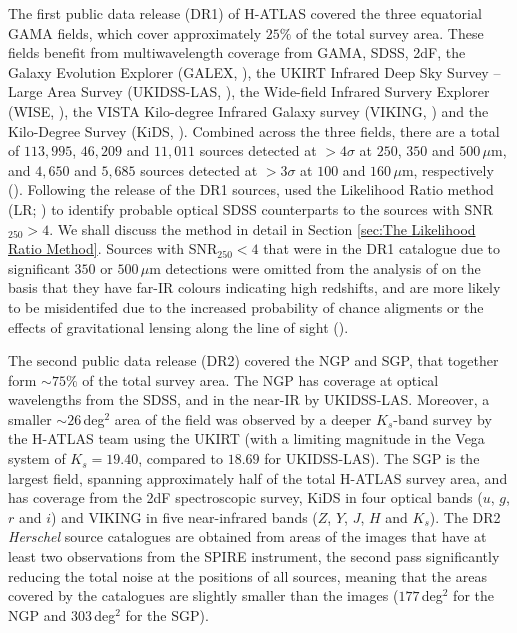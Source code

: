 The first public data release (DR1) of H-ATLAS covered the three equatorial GAMA fields, which cover approximately $25\%$ of the total survey area. These fields benefit from multiwavelength coverage from GAMA, SDSS, 2dF, the Galaxy Evolution Explorer (GALEX, \citealt{Martin_2005}), the UKIRT Infrared Deep Sky Survey -- Large Area Survey (UKIDSS-LAS, \citealt{Lawrence_2007}), the Wide-field Infrared Survery Explorer (WISE, \citealt{Wright_2010}), the VISTA Kilo-degree Infrared Galaxy survey (VIKING, \citealt{Edge_2013}) and the Kilo-Degree Survey (KiDS, \citealt{deJong_2013}). Combined across the three fields, there are a total of $113,995$, $46,209$ and $11,011$ sources detected at $> 4\sigma$ at $250$, $350$ and $500\,\mu$m, and $4,650$ and $5,685$ sources detected at $> 3\sigma$ at $100$ and $160\,\mu$m, respectively (\citealt{Valiante_2016}). Following the release of the DR1 sources, \citealt{Bourne_2016} used the Likelihood Ratio method (LR; \citealt{Sutherland_1992, Ciliegi_2003}) to identify probable optical SDSS counterparts to the sources with SNR$_{250} > 4$. We shall discuss the method in detail in Section \ref{sec:The Likelihood Ratio Method}. Sources with SNR$_{250} < 4$ that were in the DR1 catalogue due to significant $350$ or $500\,\mu$m detections were omitted from the analysis of \citealt{Bourne_2016} on the basis that they have far-IR colours indicating high redshifts, and are more likely to be misidentifed due to the increased probability of chance aligments or the effects of gravitational lensing along the line of sight \mbox{(\citealt{Negrello_2010, Pearson_2013, Bourne_2014}).}

The second public data release (DR2) covered the NGP and SGP, that together form $\sim 75\%$ of the total survey area. The NGP has coverage at optical wavelengths from the SDSS, and in the near-IR by UKIDSS-LAS. Moreover, a smaller $\sim26\,$deg$^2$ area of the field was observed by a deeper $K_s$-band survey by the H-ATLAS team using the UKIRT (with a limiting magnitude in the Vega system of $K_s = 19.40$, compared to $18.69$ for UKIDSS-LAS). The SGP is the largest field, spanning approximately half of the total H-ATLAS survey area, and has coverage from the 2dF spectroscopic survey, KiDS in four optical bands ($u$, $g$, $r$ and $i$) and VIKING in five near-infrared bands ($Z$, $Y$, $J$, $H$ and $K_s$). The DR2 \textit{Herschel} source catalogues are obtained from areas of the images that have at least two observations from the SPIRE instrument, the second pass significantly reducing the total noise at the positions of all sources, meaning that the areas covered by the catalogues are slightly smaller than the images ($177\,$deg$^2$ for the NGP and $303\,$deg$^2$ for the SGP).

